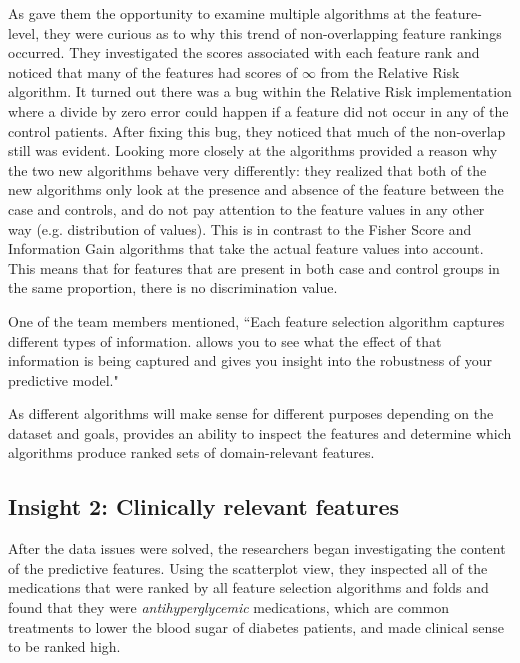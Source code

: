 As \infuse gave them the opportunity to
examine multiple algorithms at the feature-level, they were curious as
to why this trend of non-overlapping feature rankings occurred.
They investigated the scores associated with each feature rank
and noticed that many of the features had scores
of $\infty$ from the Relative Risk algorithm.
It turned out there was a bug within the Relative Risk implementation where a
divide by zero error could happen if a feature did not occur
in any of the control patients.  After fixing this bug, they noticed that much of the non-overlap still was evident.  Looking more closely at the algorithms provided a
reason why the two new algorithms behave very differently:  they realized that both of the new algorithms only look at the presence and absence of the feature between the case and controls,
and do not pay attention to the feature values in any other way (e.g. distribution of values).
This is in contrast to the Fisher Score and Information Gain algorithms that take
the actual feature values into account.  This means that for features that are present in both case
and control groups in the same proportion, there is no discrimination value.

One of the team members mentioned, ``Each feature selection algorithm captures different types of information.  \infuse allows you to see what the effect of that information is being captured and gives you insight into the robustness of your predictive model."

As different algorithms will make sense for different purposes depending on the dataset and goals, \infuse provides an ability to inspect the features and determine
which algorithms produce ranked sets of domain-relevant features.

\subsection{Insight 2: Clinically relevant features}
After the data issues were solved, the researchers began investigating
the content of the predictive features.
Using the scatterplot view,
they inspected all of the medications that were ranked by all
feature selection algorithms and folds and found that they
were \textit{antihyperglycemic} medications, which are common treatments to lower the blood sugar of diabetes patients, and made clinical sense to be ranked high.

